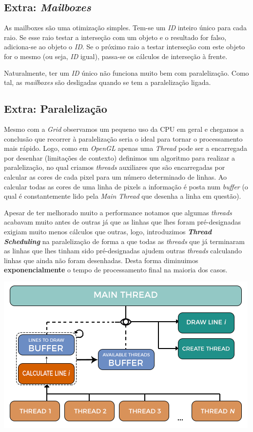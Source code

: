 \documentclass{article}
\begin{document}
        \subsection*{Extra: \textit{Mailboxes}}
            \par
            As mailboxes são uma otimização simples. Tem-se um \textit{ID} inteiro único para cada raio. Se esse raio testar a interseção com um objeto e o resultado for falso, adiciona-se ao objeto o \textit{ID}. Se o próximo raio a testar interseção com este objeto for o mesmo (ou seja, \textit{ID} igual), passa-se os cálculos de interseção à frente.
            \par
            Naturalmente, ter um \textit{ID} único não funciona muito bem com paralelização. Como tal, as \textit{mailboxes} são desligadas quando se tem a paralelização ligada.

        \subsection*{Extra: Paralelização}
            \par
	Mesmo com a \textit{Grid} observamos um pequeno uso da CPU em geral e chegamos a conclusão que recorrer à paralelização seria o ideal para tornar o processamento mais rápido. Logo, como em \textit{OpenGL} apenas uma \textit{Thread} pode ser a encarregada por desenhar (limitações de contexto) definimos um algoritmo para realizar a paralelização, no qual criamos \textit{threads} auxiliares que são encarregadas por calcular as cores de cada pixel para um número determinado de linhas. Ao calcular todas as cores de uma linha de pixels a informação é posta num \textit{buffer} (o qual é constantemente lido pela \textit{Main Thread} que desenha a linha em questão).
\par
	 Apesar de ter melhorado muito a performance notamos que algumas \textit{threads} acabavam muito antes de outras já que as linhas que lhes foram pré-designadas exigiam muito menos cálculos que outras, logo, introduzimos \textbf{\textit{Thread Scheduling}} na paralelização de forma a que todas as \textit{threads} que já terminaram as linhas que lhes tinham sido pré-designadas ajudem outras \textit{threads} calculando linhas que ainda não foram desenhadas. Desta forma diminuimos \textbf{exponencialmente} o tempo de processamento final na maioria dos casos.
	\begin{center}
	\includegraphics[scale=0.65]{thread}
	\end{center}
\end{document}
